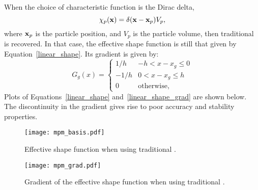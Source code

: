 When the choice of characteristic function is the Dirac delta,
\begin{equation}\label{MPM_char}
\chi_p(\mathbf{x}) = \delta(\mathbf{x}-\mathbf{x}_p)V_p , 
\end{equation}
where $\mathbf{x}_p$ is the particle position, and $V_p$ is the particle volume,
then traditional \MPM is recovered.  In that case, the effective shape function
is still that given by Equation~\eqref{linear_shape}.  Its gradient is given by:
\begin{equation} \label{linear_shape_grad}
G_g\left(x\right) = \begin{cases} {1 / h} & {-h < x-x_g \le 0} \\
                    {-1 / h} & {0  < x-x_g \le h} \\
                    0 & \text{otherwise},
       \end{cases}
\end{equation}
Plots of Equations~\ref{linear_shape} and~\ref{linear_shape_grad} are shown
below.  The discontinuity in the gradient gives rise to poor accuracy and
stability properties.
\begin{figure}
  \centering
  \texttt{[image: mpm\_basis.pdf]}
  \caption{Effective shape function when using traditional \MPM.}
  \label{Fig:MPMShape}
\end{figure}
\begin{figure}
  \centering
  \texttt{[image: mpm\_grad.pdf]}
  \caption{Gradient of the effective shape function when using traditional \MPM.}
  \label{Fig:MPMShapeGrad}
\end{figure}

